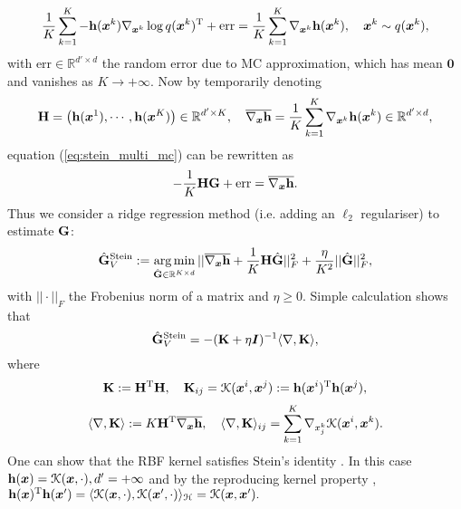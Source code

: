\begin{equation}
\frac{1}{K} \sum_{k=1}^K -\mathbf{h}(\bm{x}^k) \nabla_{\bm{x}^k} \log q(\bm{x}^k)^{\text{T}} + \text{err} = \frac{1}{K} \sum_{k=1}^K \nabla_{\bm{x}^k} \mathbf{h}(\bm{x}^k), \quad \bm{x}^k \sim q(\bm{x}^k),
\label{eq:stein_multi_mc}
\end{equation}
with $\text{err} \in \mathbb{R}^{d' \times d}$ the random error due to MC approximation, which has mean $\bm{0}$ and vanishes as $K \rightarrow +\infty$. Now by temporarily denoting
$$
\mathbf{H} = \left( \mathbf{h}(\bm{x}^1), \cdots , \mathbf{h}(\bm{x}^K) \right) \in \mathbb{R}^{d' \times K}, \quad
\overline{\nabla_{\bm{x}} \mathbf{h}} = \frac{1}{K} \sum_{k=1}^K \nabla_{\bm{x}^k} \mathbf{h}(\bm{x}^k) \in \mathbb{R}^{d' \times d},
$$
equation (\ref{eq:stein_multi_mc}) can be rewritten as
$$-\frac{1}{K} \mathbf{H} \mathbf{G} + \text{err} = \overline{\nabla_{\bm{x}} \mathbf{h}}.$$
Thus we consider a ridge regression method (i.e. adding an $\ell_2$ regulariser) to estimate $\mathbf{G}$:
\begin{equation}
\hat{\mathbf{G}}_V^{\text{Stein}} := \operatorname*{arg\,min}_{\hat{\mathbf{G}} \in \mathbb{R}^{K \times d} } || \overline{\nabla_{\bm{x}} \mathbf{h}} + \frac{1}{K} \mathbf{H} \hat{\mathbf{G}} ||_{F}^2 + \frac{\eta}{K^2} || \hat{\mathbf{G}} ||_{F}^2,
\label{eq:stein_objective}
\end{equation}
with $|| \cdot ||_{F}$ the Frobenius norm of a matrix and $\eta \geq 0$. Simple calculation shows that
\begin{equation}
\hat{\mathbf{G}}_V^{\text{Stein}} = -( \mathbf{K} + \eta \bm{I} )^{-1} \langle \nabla, \mathbf{K} \rangle,
\label{eq:stein_estimator}
\end{equation}
where 
$$\mathbf{K} := \mathbf{H}^{\text{T}} \mathbf{H}, \quad \mathbf{K}_{ij} = \mathcal{K}(\bm{x}^i, \bm{x}^j) := \mathbf{h}(\bm{x}^i)^{\text{T}} \mathbf{h}(\bm{x}^j),$$
$$\langle \nabla, \mathbf{K} \rangle := K \mathbf{H}^{\text{T}} \overline{\nabla_{\bm{x}} \mathbf{h}}, \quad \langle \nabla, \mathbf{K} \rangle_{ij} = \sum_{k=1}^{K} \nabla_{x^k_j} \mathcal{K}(\bm{x}^i, \bm{x}^k).$$
%
One can show that the RBF kernel satisfies Stein's identity \citep{liu:ksd2016}. In this case $\mathbf{h}(\bm{x}) = \mathcal{K}(\bm{x}, \cdot), d' = +\infty$ and by the reproducing kernel property  \citep{berlinet:rkhs2011},
$\mathbf{h}(\bm{x})^{\text{T}} \mathbf{h}(\bm{x}') = \langle \mathcal{K}(\bm{x}, \cdot), \mathcal{K}(\bm{x}', \cdot) \rangle_{\mathcal{H}} = \mathcal{K}(\bm{x}, \bm{x}') .$


